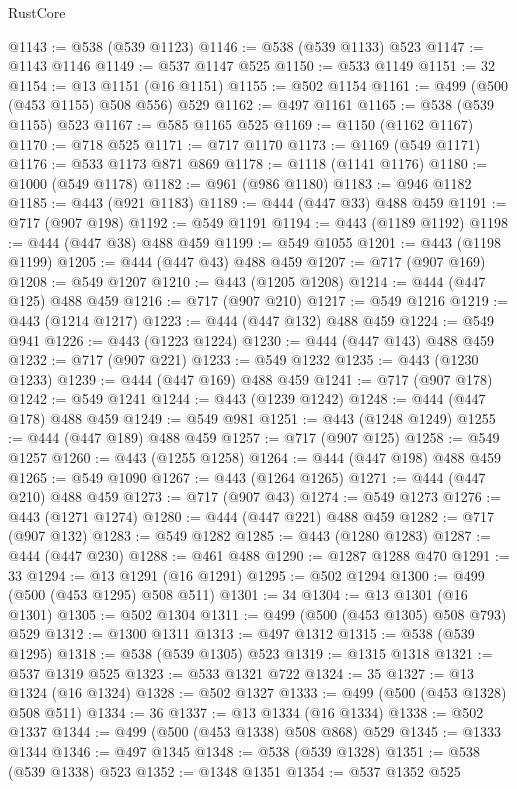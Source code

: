\begin{lexlean}{RustCore}
\begin{coremodule}
@1143 := @538 (@539 @1123)
@1146 := @538 (@539 @1133) @523
@1147 := @1143 @1146
@1149 := @537 @1147 @525
@1150 := @533 @1149
@1151 := 32
@1154 := @13 @1151 (@16 @1151)
@1155 := @502 @1154
@1161 := @499 (@500 (@453 @1155) @508 @556) @529
@1162 := @497 @1161
@1165 := @538 (@539 @1155) @523
@1167 := @585 @1165 @525
@1169 := @1150 (@1162 @1167)
@1170 := @718 @525
@1171 := @717 @1170
@1173 := @1169 (@549 @1171)
@1176 := @533 @1173 @871 @869
@1178 := @1118 (@1141 @1176)
@1180 := @1000 (@549 @1178)
@1182 := @961 (@986 @1180)
@1183 := @946 @1182
@1185 := @443 (@921 @1183)
@1189 := @444 (@447 @33) @488 @459
@1191 := @717 (@907 @198)
@1192 := @549 @1191
@1194 := @443 (@1189 @1192)
@1198 := @444 (@447 @38) @488 @459
@1199 := @549 @1055
@1201 := @443 (@1198 @1199)
@1205 := @444 (@447 @43) @488 @459
@1207 := @717 (@907 @169)
@1208 := @549 @1207
@1210 := @443 (@1205 @1208)
@1214 := @444 (@447 @125) @488 @459
@1216 := @717 (@907 @210)
@1217 := @549 @1216
@1219 := @443 (@1214 @1217)
@1223 := @444 (@447 @132) @488 @459
@1224 := @549 @941
@1226 := @443 (@1223 @1224)
@1230 := @444 (@447 @143) @488 @459
@1232 := @717 (@907 @221)
@1233 := @549 @1232
@1235 := @443 (@1230 @1233)
@1239 := @444 (@447 @169) @488 @459
@1241 := @717 (@907 @178)
@1242 := @549 @1241
@1244 := @443 (@1239 @1242)
@1248 := @444 (@447 @178) @488 @459
@1249 := @549 @981
@1251 := @443 (@1248 @1249)
@1255 := @444 (@447 @189) @488 @459
@1257 := @717 (@907 @125)
@1258 := @549 @1257
@1260 := @443 (@1255 @1258)
@1264 := @444 (@447 @198) @488 @459
@1265 := @549 @1090
@1267 := @443 (@1264 @1265)
@1271 := @444 (@447 @210) @488 @459
@1273 := @717 (@907 @43)
@1274 := @549 @1273
@1276 := @443 (@1271 @1274)
@1280 := @444 (@447 @221) @488 @459
@1282 := @717 (@907 @132)
@1283 := @549 @1282
@1285 := @443 (@1280 @1283)
@1287 := @444 (@447 @230)
@1288 := @461 @488
@1290 := @1287 @1288 @470
@1291 := 33
@1294 := @13 @1291 (@16 @1291)
@1295 := @502 @1294
@1300 := @499 (@500 (@453 @1295) @508 @511)
@1301 := 34
@1304 := @13 @1301 (@16 @1301)
@1305 := @502 @1304
@1311 := @499 (@500 (@453 @1305) @508 @793) @529
@1312 := @1300 @1311
@1313 := @497 @1312
@1315 := @538 (@539 @1295)
@1318 := @538 (@539 @1305) @523
@1319 := @1315 @1318
@1321 := @537 @1319 @525
@1323 := @533 @1321 @722
@1324 := 35
@1327 := @13 @1324 (@16 @1324)
@1328 := @502 @1327
@1333 := @499 (@500 (@453 @1328) @508 @511)
@1334 := 36
@1337 := @13 @1334 (@16 @1334)
@1338 := @502 @1337
@1344 := @499 (@500 (@453 @1338) @508 @868) @529
@1345 := @1333 @1344
@1346 := @497 @1345
@1348 := @538 (@539 @1328)
@1351 := @538 (@539 @1338) @523
@1352 := @1348 @1351
@1354 := @537 @1352 @525

\end{coremodule}
\end{lexlean}

